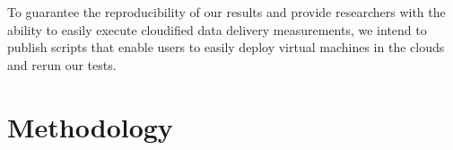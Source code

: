 \documentclass{hotnets17}
\newcommand{\mycomm}[3]{{\color{#2} \textbf{[#1: #3]}}}
\newcommand{\mycomm}[3]{}
\newcommand{\IK}[1]{\mycomm{IK}{blue}{#1}}
\newcommand{\AB}[1]{\mycomm{AB}{Orange}{#1}}
\begin{document}
\vspace{0.05in} To guarantee the reproducibility of our results and provide researchers with the ability to easily execute cloudified data delivery measurements, we intend to publish scripts that enable users to easily deploy virtual machines in the clouds and rerun our tests.


\section{Methodology}



\end{document}
